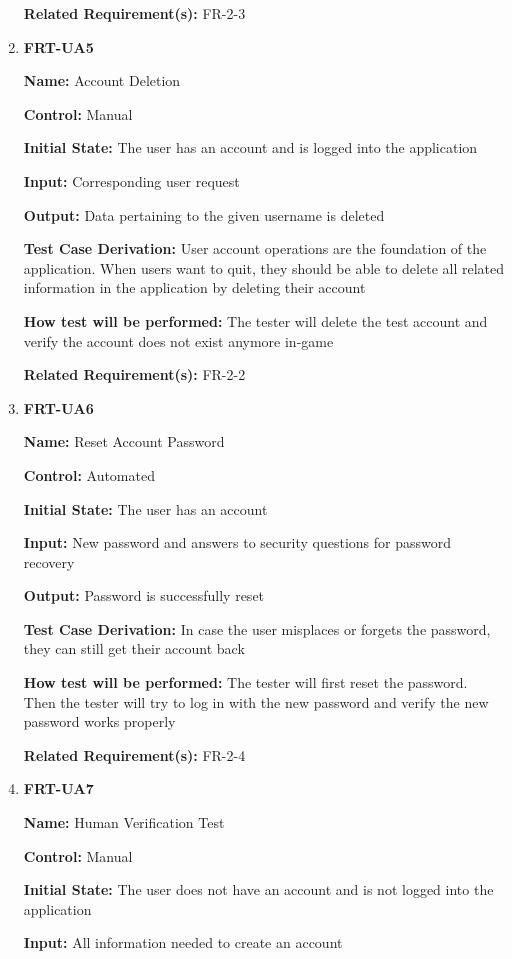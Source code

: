 \documentclass[12pt, titlepage]{article}
\begin{document}
\begin{enumerate}
\textbf{Related Requirement(s):} FR-2-3

\item{\textbf{FRT-UA5}}

\textbf{Name:} Account Deletion

\textbf{Control:} Manual
					
\textbf{Initial State:} The user has an account and is logged into the application

\textbf{Input:} Corresponding user request
					
\textbf{Output:} Data pertaining to the given username is deleted

\textbf{Test Case Derivation:} User account operations are the foundation of the application. When users want to quit, they should be able to delete all related information in the application by deleting their account
					
\textbf{How test will be performed:} The tester will delete the test account and verify the account does not exist anymore in-game

\textbf{Related Requirement(s):} FR-2-2

\item{\textbf{FRT-UA6}}

\textbf{Name:} Reset Account Password

\textbf{Control:} Automated
					
\textbf{Initial State:} The user has an account

\textbf{Input:} New password and answers to security questions for password recovery
					
\textbf{Output:} Password is successfully reset

\textbf{Test Case Derivation:} In case the user misplaces or forgets the password, they can still get their account back
					
\textbf{How test will be performed:} The tester will first reset the password. Then the tester will try to log in with the new password and verify the new password works properly

\textbf{Related Requirement(s):} FR-2-4

\item{\textbf{FRT-UA7}}

\textbf{Name:} Human Verification Test

\textbf{Control:} Manual
					
\textbf{Initial State:} The user does not have an account and is not logged into the application

\textbf{Input:} All information needed to create an account
					

\end{enumerate}
\end{document}

